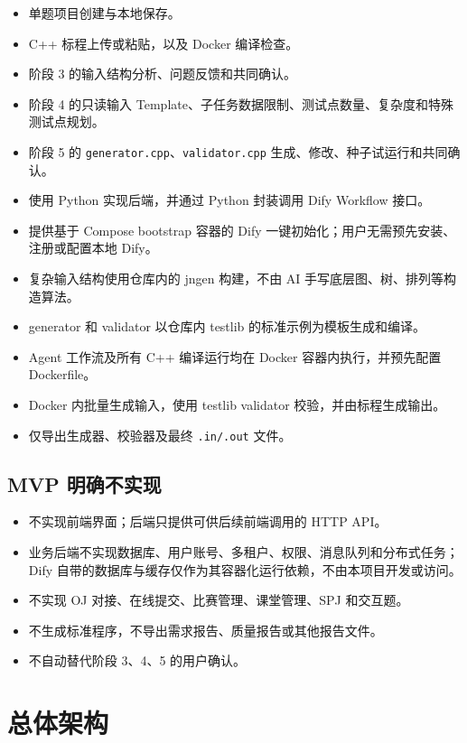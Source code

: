 \documentclass[UTF8,zihao=-4]{ctexart}
\begin{document}
\begin{itemize}
  \item 单题项目创建与本地保存。
  \item C++ 标程上传或粘贴，以及 Docker 编译检查。
  \item 阶段 3 的输入结构分析、问题反馈和共同确认。
  \item 阶段 4 的只读输入 Template、子任务数据限制、测试点数量、复杂度和特殊测试点规划。
  \item 阶段 5 的 \texttt{generator.cpp}、\texttt{validator.cpp} 生成、修改、种子试运行和共同确认。
  \item 使用 Python 实现后端，并通过 Python 封装调用 Dify Workflow 接口。
  \item 提供基于 Compose bootstrap 容器的 Dify 一键初始化；用户无需预先安装、注册或配置本地 Dify。
  \item 复杂输入结构使用仓库内的 jngen 构建，不由 AI 手写底层图、树、排列等构造算法。
  \item generator 和 validator 以仓库内 testlib 的标准示例为模板生成和编译。
  \item Agent 工作流及所有 C++ 编译运行均在 Docker 容器内执行，并预先配置 Dockerfile。
  \item Docker 内批量生成输入，使用 testlib validator 校验，并由标程生成输出。
  \item 仅导出生成器、校验器及最终 \texttt{.in/.out} 文件。
\end{itemize}

\subsection{MVP 明确不实现}

\begin{itemize}
  \item 不实现前端界面；后端只提供可供后续前端调用的 HTTP API。
  \item 业务后端不实现数据库、用户账号、多租户、权限、消息队列和分布式任务；Dify 自带的数据库与缓存仅作为其容器化运行依赖，不由本项目开发或访问。
  \item 不实现 OJ 对接、在线提交、比赛管理、课堂管理、SPJ 和交互题。
  \item 不生成标准程序，不导出需求报告、质量报告或其他报告文件。
  \item 不自动替代阶段 3、4、5 的用户确认。
\end{itemize}

\section{总体架构}
\end{document}
